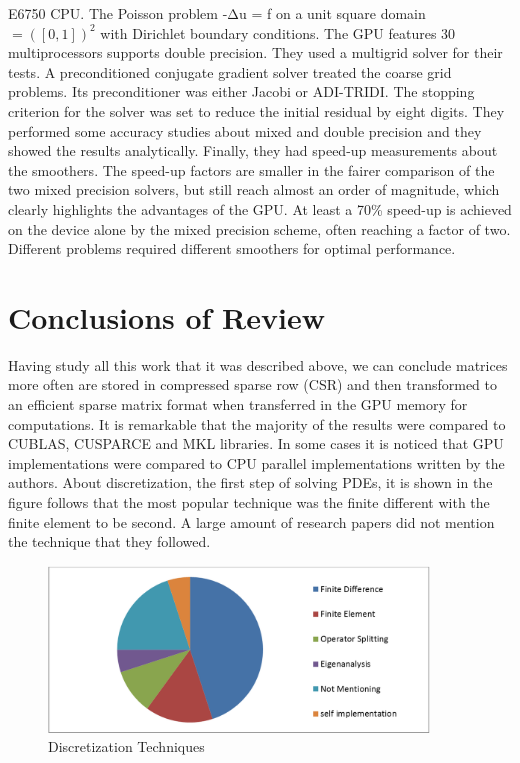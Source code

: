 E6750 CPU. The Poisson problem -Δu = f on a unit square domain  $= ([0,1])^2$ with Dirichlet boundary conditions. The GPU features 30 multiprocessors supports double precision. They used a multigrid solver for their tests. A preconditioned conjugate gradient solver treated the coarse grid problems. Its preconditioner was either Jacobi or ADI-TRIDI. The stopping criterion for the solver was set to reduce the initial residual by eight digits. They performed some accuracy studies about mixed and double precision and they showed the results analytically. Finally, they had speed-up measurements about the smoothers. The speed-up factors are smaller in the fairer comparison of the two mixed precision solvers, but still reach almost an order of magnitude, which clearly highlights the advantages of the GPU. At least a 70\% speed-up is achieved on the device alone by the mixed precision scheme, often reaching a factor of two. Different problems required different smoothers for optimal performance.




\section{Conclusions of Review}

Having study all this work that it was described above, we can conclude matrices more often are stored in compressed sparse row (CSR) and then transformed to an efficient sparse matrix format when transferred in the GPU memory for computations.
It is remarkable that the majority of the results were compared to CUBLAS, CUSPARCE and MKL libraries. In some cases it is noticed that GPU implementations were compared to CPU parallel implementations written by the authors.
About discretization, the first step of solving PDEs, it is shown in the figure follows that the most popular technique was the finite different with the finite element to be second. A large amount of research papers did not mention the technique that they followed.

 \begin{figure}[H]
    \centering
        \includegraphics[totalheight=0.3\textheight,width=0.9\textwidth]{review_conclusion.png}
    \caption{Discretization Techniques}
    \label{fig:Conclusion Graph}
\end{figure}

